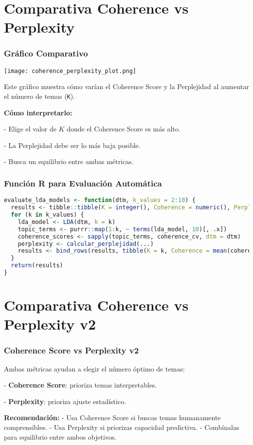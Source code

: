 \documentclass[10pt]{beamer}
\begin{document}
\section{Comparativa Coherence vs Perplexity}
\begin{frame}[fragile]
\frametitle{Gráfico Comparativo}
\begin{center}
\texttt{[image: coherence\_perplexity\_plot.png]}
\end{center}

Este gráfico muestra cómo varían el Coherence Score y la Perplejidad al aumentar el número de temas (\texttt{K}).

\textbf{Cómo interpretarlo:}

    
- Elige el valor de $ K $ donde el Coherence Score es más alto.
    
- La Perplejidad debe ser lo más baja posible.
    
- Busca un equilibrio entre ambas métricas.

\end{frame}

\begin{frame}[fragile]
\frametitle{Función R para Evaluación Automática}
\begin{lstlisting}[language=R]
evaluate_lda_models <- function(dtm, k_values = 2:10) {
  results <- tibble::tibble(K = integer(), Coherence = numeric(), Perplexity = numeric())
  for (k in k_values) {
    lda_model <- LDA(dtm, k = k)
    topic_terms <- purrr::map(1:k, ~ terms(lda_model, 10)[, .x])
    coherence_scores <- sapply(topic_terms, coherence_cv, dtm = dtm)
    perplexity <- calcular_perplejidad(...)
    results <- bind_rows(results, tibble(K = k, Coherence = mean(coherence_scores), Perplexity = perplexity))
  }
  return(results)
}
\end{lstlisting}
\end{frame}



\section{Comparativa Coherence vs Perplexity v2}
\begin{frame}
\frametitle{Coherence Score vs Perplexity v2}
Ambas métricas ayudan a elegir el número óptimo de temas:


    
- \textbf{Coherence Score}: prioriza temas interpretables.
    
- \textbf{Perplexity}: prioriza ajuste estadístico.


\textbf{Recomendación:}
- Usa Coherence Score si buscas temas humanamente comprensibles.
- Usa Perplexity si priorizas capacidad predictiva.
- Combínalas para equilibrio entre ambos objetivos.
\end{frame}
\end{document}
